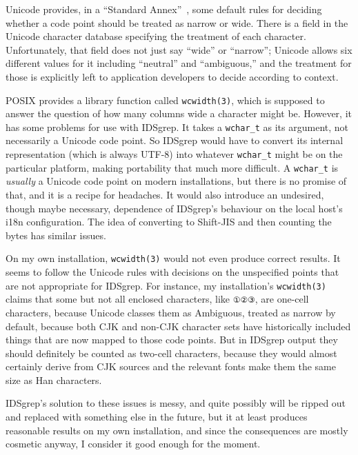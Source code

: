 \documentclass[twocolumn]{report}
\begin{document}
Unicode provides, in a ``Standard Annex''~\cite{Unicode:Width}, some default
rules for deciding whether a code point should be treated as narrow or wide. 
There is a field in the Unicode character database specifying the treatment
of each character.  Unfortunately, that field does not just say ``wide'' or
``narrow''; Unicode allows six different values for it including ``neutral''
and ``ambiguous,'' and the treatment for those is explicitly left to
application developers to decide according to context.

POSIX provides a library function called \texttt{wcwidth(3)}, which is
supposed to answer the question of how many columns wide a character might
be.  However, it has some problems for use with IDSgrep.  It takes a
\texttt{wchar\_t} as its argument, not necessarily a Unicode code point.  So
IDSgrep would have to convert its internal representation (which is always
UTF-8) into whatever \texttt{wchar\_t} might be on the particular platform,
making portability that much more difficult.  A \texttt{wchar\_t} is
\emph{usually} a Unicode code point on modern installations, but there is no
promise of that, and it is a recipe for headaches.  It would also introduce
an undesired, though maybe necessary, dependence of IDSgrep's behaviour on
the local host's i18n configuration.  The idea of converting to Shift-JIS
and then counting the bytes has similar issues.

On my own installation, \texttt{wcwidth(3)} would not even produce correct
results.  It seems to follow the Unicode rules with decisions on the
unspecified points that are not appropriate for IDSgrep.  For instance, my
installation's \texttt{wcwidth(3)} claims that some but not all enclosed
characters, like \texttt{①②③}, are one-cell characters, because Unicode
classes them as Ambiguous, treated as narrow by default, because both CJK
and non-CJK character sets have historically included things that are now
mapped to those code points.  But in IDSgrep output they should definitely
be counted as two-cell characters, because they would almost certainly
derive from CJK sources and the relevant fonts make them the same size as
Han characters.

IDSgrep's solution to these issues is messy, and quite possibly will be
ripped out and replaced with something else in the future, but it at least
produces reasonable results on my own installation, and since the
consequences are mostly cosmetic anyway, I consider it good enough for the
moment.
\end{document}
